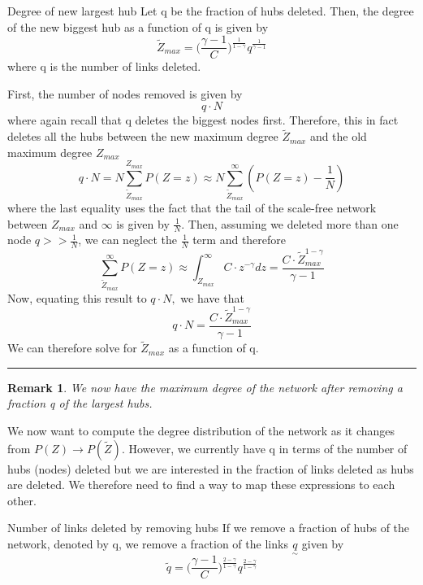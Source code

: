 \documentclass[twoside]{article}
\newcommand{\utilde}{\underset{\sim}}
\newtheorem{remark}[theorem]{Remark}
\newenvironment{proof}{{\bf Proof:}}{\hfill\rule{2mm}{2mm}}
\begin{document}
\begin{proposition_exam}{Degree of new largest hub}{} Let q be the fraction of hubs deleted. Then, the degree of the new biggest hub as a function of q is given by
$$
\tilde{Z}_{max} = \bigg(\frac{\gamma - 1}{C} \bigg)^{\frac{1}{1 - \gamma}}q^{\frac{1}{\gamma - 1}}
$$
where q is the number of links deleted.
\end{proposition_exam}
\begin{proof} First, the number of nodes removed is given by 
$$
q \cdot N
$$
where again recall that q deletes the biggest nodes first. Therefore, this in fact deletes all the hubs between the new maximum degree $\tilde{Z}_{max}$ and the old maximum degree $Z_{max}$
$$
q \cdot N = N \sum_{\tilde{Z}_{max}}^{Z_{max}}P(Z = z) \approx N \sum_{\tilde{Z}_{max}}^{\infty}(P(Z = z) - \frac{1}{N})
$$
where the last equality uses the fact that the tail of the scale-free network between $Z_{max}$ and $\infty$ is given by $\frac{1}{N}$. Then, assuming we deleted more than one node $q >> \frac{1}{N}$, we can neglect the $\frac{1}{N}$ term and therefore 
$$
\sum_{\tilde{Z}_{max}}^{\infty}P(Z = z) \approx \int_{Z_{max}}^{\infty} C \cdot z^{-\gamma}dz = \frac{C \cdot \tilde{Z}_{max}^{1 - \gamma}}{\gamma - 1}
$$
Now, equating this result to $q \cdot N,$ we have that 
$$
q \cdot N = \frac{C \cdot \tilde{Z}_{max}^{1 - \gamma}}{\gamma - 1}
$$
We can therefore solve for $\tilde{Z}_{max}$ as a function of q.
\end{proof}

\begin{remark} We now have the maximum degree of the network after removing a fraction q of the largest hubs.
\end{remark}

We now want to compute the degree distribution of the network as it changes from $P(Z) \rightarrow P(\tilde{Z})$. However, we currently have q in terms of the number of hubs (nodes) deleted but we are interested in the fraction of links deleted as hubs are deleted. We therefore need to find a way to map these expressions to each other.

\begin{proposition_exam}{Number of links deleted by removing hubs}{}
If we remove a fraction of hubs of the network, denoted by q, we remove a fraction of the links $\utilde{q}$ given by
$$
\tilde{q} = \bigg(\frac{\gamma - 1}{C}\bigg)^{\frac{2 - \gamma}{1 - \gamma}}q^{\frac{2 - \gamma}{1- \gamma}}
$$
\end{proposition_exam}
\end{document}
